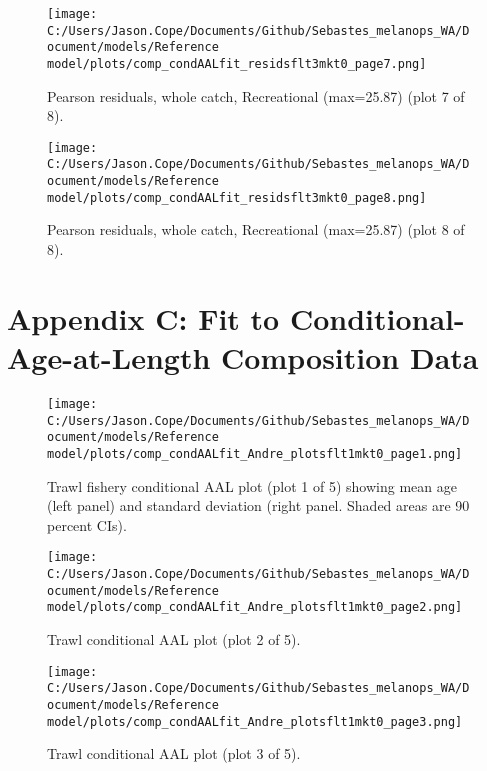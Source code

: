 \documentclass[11pt,
  letterpaper,
]{article}
\begin{document}
\begin{figure}
{\centering
\texttt{[image: C:/Users/Jason.Cope/Documents/Github/Sebastes\_melanops\_WA/Document/models/Reference model/plots/comp\_condAALfit\_residsflt3mkt0\_page7.png]}
}
\caption{Pearson residuals, whole catch, Recreational (max=25.87) (plot 7 of 8).\label{fig:comp_condAALfit_residsflt3mkt0_page7}}
\end{figure}

\begin{figure}
{\centering
\texttt{[image: C:/Users/Jason.Cope/Documents/Github/Sebastes\_melanops\_WA/Document/models/Reference model/plots/comp\_condAALfit\_residsflt3mkt0\_page8.png]}
}
\caption{Pearson residuals, whole catch, Recreational (max=25.87) (plot 8 of 8).\label{fig:comp_condAALfit_residsflt3mkt0_page8}}
\end{figure}

\clearpage

\hypertarget{app-c}{%
\section{Appendix C: Fit to Conditional-Age-at-Length Composition Data}\label{app-c}}

\begin{figure}
{\centering
\texttt{[image: C:/Users/Jason.Cope/Documents/Github/Sebastes\_melanops\_WA/Document/models/Reference model/plots/comp\_condAALfit\_Andre\_plotsflt1mkt0\_page1.png]}
}
\caption{Trawl fishery conditional AAL plot (plot 1 of 5) showing mean age (left panel) and standard deviation (right panel. Shaded areas are 90 percent CIs).\label{fig:comp_condAALfit_Andre_plotsflt1mkt0_page1}}
\end{figure}

\begin{figure}
{\centering
\texttt{[image: C:/Users/Jason.Cope/Documents/Github/Sebastes\_melanops\_WA/Document/models/Reference model/plots/comp\_condAALfit\_Andre\_plotsflt1mkt0\_page2.png]}
}
\caption{Trawl conditional AAL plot (plot 2 of 5).\label{fig:comp_condAALfit_Andre_plotsflt1mkt0_page2}}
\end{figure}

\begin{figure}
{\centering
\texttt{[image: C:/Users/Jason.Cope/Documents/Github/Sebastes\_melanops\_WA/Document/models/Reference model/plots/comp\_condAALfit\_Andre\_plotsflt1mkt0\_page3.png]}
}
\caption{Trawl conditional AAL plot (plot 3 of 5).\label{fig:comp_condAALfit_Andre_plotsflt1mkt0_page3}}
\end{figure}
\end{document}
